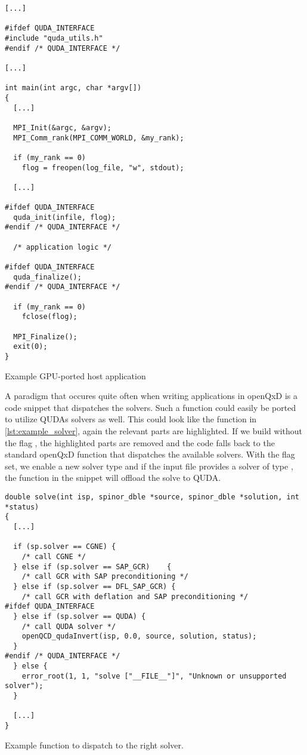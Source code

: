 \begin{codelisting}
\begin{verbatim}
[...]

#ifdef QUDA_INTERFACE
#include "quda_utils.h"
#endif /* QUDA_INTERFACE */

[...]

int main(int argc, char *argv[])
{
  [...]

  MPI_Init(&argc, &argv);
  MPI_Comm_rank(MPI_COMM_WORLD, &my_rank);

  if (my_rank == 0)
    flog = freopen(log_file, "w", stdout);

  [...]

#ifdef QUDA_INTERFACE
  quda_init(infile, flog);
#endif /* QUDA_INTERFACE */

  /* application logic */

#ifdef QUDA_INTERFACE
  quda_finalize();
#endif /* QUDA_INTERFACE */

  if (my_rank == 0)
    fclose(flog);

  MPI_Finalize();
  exit(0);
}
\end{verbatim}
\caption{Example GPU-ported host application}
\label{lst:example_program}
\end{codelisting}

A paradigm that occures quite often when writing applications in openQxD is a code snippet that dispatches the solvers. Such a function could easily be ported to utilize QUDAs solvers as well. This could look like the function  in \cref{lst:example_solver}, again the relevant parts are highlighted. If we build without the flag , the highlighted parts are removed and the code falls back to the standard openQxD function that dispatches the available solvers. With the flag set, we enable a new solver type  and if the input file provides a solver of type , the function in the snippet will offload the solve to QUDA.

\begin{codelisting}
\begin{verbatim}
double solve(int isp, spinor_dble *source, spinor_dble *solution, int *status)
{
  [...]

  if (sp.solver == CGNE) {
    /* call CGNE */
  } else if (sp.solver == SAP_GCR)    {
    /* call GCR with SAP preconditioning */
  } else if (sp.solver == DFL_SAP_GCR) {
    /* call GCR with deflation and SAP preconditioning */
#ifdef QUDA_INTERFACE
  } else if (sp.solver == QUDA) {
    /* call QUDA solver */
    openQCD_qudaInvert(isp, 0.0, source, solution, status);
  }
#endif /* QUDA_INTERFACE */
  } else {
    error_root(1, 1, "solve ["__FILE__"]", "Unknown or unsupported solver");
  }

  [...]
}
\end{verbatim}
\caption{Example function to dispatch to the right solver.}
\label{lst:example_solver}
\end{codelisting}

